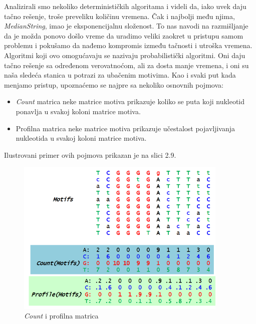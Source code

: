 Analizirali smo nekoliko determinističkih algoritama i videli da, iako uvek daju tačno rešenje, troše preveliku količinu vremena. Čak i najbolji među njima, \textit{MedianString}, imao je eksponencijalnu složenost. To nas navodi na razmišljanje da je možda ponovo došlo vreme da uradimo veliki zaokret u pristupu samom problemu i pokušamo da nađemo kompromis između tačnosti i utroška vremena. Algoritmi koji ovo omogućavaju se nazivaju probabilistički algoritmi. Oni daju tačno rešenje sa određenom verovatnoćom, ali za dosta manje vremena, i oni su naša sledeća stanica u potrazi za ubačenim motivima. Kao i svaki put kada menjamo pristup, upoznaćemo se najpre sa nekoliko osnovnih pojmova:
 
\begin{itemize}
    \item \textit{Count} matrica neke matrice motiva prikazuje koliko se puta koji nukleotid ponavlja u svakoj koloni matrice motiva.
    \item Profilna matrica neke matrice motiva prikazuje učestalost pojavljivanja nukleotida u svakoj koloni matrice motiva.
\end{itemize}

Ilustrovani primer ovih pojmova prikazan je na slici 2.9.

\begin{figure}[h]
\caption{\textit{Count} i profilna matrica}
\centering
\includegraphics[width=0.9\textwidth]{poglavlja/2/slike/56.PNG}
\end{figure}

